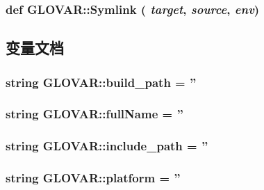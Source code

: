 \label{namespaceGLOVAR_ac120cd73f9bb2ff537b62451a4c0dba1}
\hypertarget{namespaceGLOVAR_a118820a1780cc34db70f36efa199aa6c}{
\subsubsection[{Symlink}]{\setlength{\rightskip}{0pt plus 5cm}def GLOVAR::Symlink ( {\em target}, \/   {\em source}, \/   {\em env})}}
\label{namespaceGLOVAR_a118820a1780cc34db70f36efa199aa6c}


\subsection{变量文档}
\hypertarget{namespaceGLOVAR_ab2709a5331917c6323f60b51f06d3bb0}{
\subsubsection[{build\_\-path}]{\setlength{\rightskip}{0pt plus 5cm}string {\bf GLOVAR::build\_\-path} = ''}}
\label{namespaceGLOVAR_ab2709a5331917c6323f60b51f06d3bb0}
\hypertarget{namespaceGLOVAR_adacd367e71b398b7b6d55f6e70a17966}{
\subsubsection[{fullName}]{\setlength{\rightskip}{0pt plus 5cm}string {\bf GLOVAR::fullName} = ''}}
\label{namespaceGLOVAR_adacd367e71b398b7b6d55f6e70a17966}
\hypertarget{namespaceGLOVAR_ad331badb77a9658b750ad273e3b23dbd}{
\subsubsection[{include\_\-path}]{\setlength{\rightskip}{0pt plus 5cm}string {\bf GLOVAR::include\_\-path} = ''}}
\label{namespaceGLOVAR_ad331badb77a9658b750ad273e3b23dbd}
\hypertarget{namespaceGLOVAR_ab502d063b10b046dd09e34362f9d052c}{
\subsubsection[{platform}]{\setlength{\rightskip}{0pt plus 5cm}string {\bf GLOVAR::platform} = ''}}
